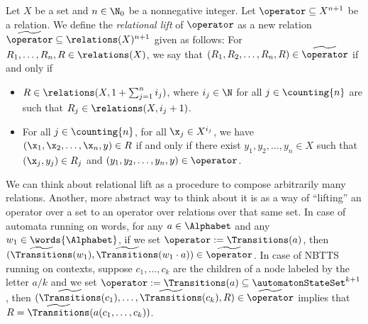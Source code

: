 \begin{definition}\label{def:relationalLift}
    Let $X$ be a set and $n \in \N_0$ be a nonnegative integer. Let $\operator \subseteq X^{n+1}$ be a relation. We define the \emph{relational lift} of $\operator$ as a new relation $\widetilde{\operator} \subseteq \relations(X)^{n+1}$ given as follows: For $R_1, \dots, R_n, R \in \relations(X)$, we say that $(R_1, R_2, \dots, R_n, R) \in \widetilde{\operator}$ if and only if
    \begin{itemize}
        \item $R \in \relations(X, 1+\sum_{j=1}^n i_j)$, where $i_j \in \N$ for all $j \in \counting{n}$ are such that $R_j \in \relations(X, i_j+1)$.
        \item For all $j \in \counting{n}$, for all $\x_j \in X^{i_j}$, we have $(\x_1, \x_2, \dots, \x_n, y) \in R$ if and only if there exist $y_1, y_2, \dots, y_n \in X$ such that $(\x_j, y_j) \in R_j$ and $(y_1, y_2, \dots, y_n, y) \in \operator$.
    \end{itemize}    
\end{definition}

We can think about relational lift as a procedure to compose arbitrarily many relations. Another, more abstract way to think about it is as a way of ``lifting'' an operator over a set to an operator over relations over that same set. In case of automata running on words, for any $a \in \Alphabet$ and any $w_1 \in \words{\Alphabet}$, if we set $\operator := \Transitions(a)$, then $(\widetilde{\Transitions}(w_1), \widetilde{\Transitions}(w_1 \cdot a)) \in \widetilde{\operator}$. In case of NBTTS running on contexts, suppose $c_1, \ldots, c_k$ are the children of a node labeled by the letter $a/k$ and we set $\operator := \Transitions(a) \subseteq \automatonStateSet^{k+1}$, then $(\widetilde{\Transitions}(c_1), \ldots, \widetilde{\Transitions}(c_k), R) \in \widetilde{\operator}$ implies that $R = \widetilde{\Transitions}(a(c_1, \ldots, c_k))$.


